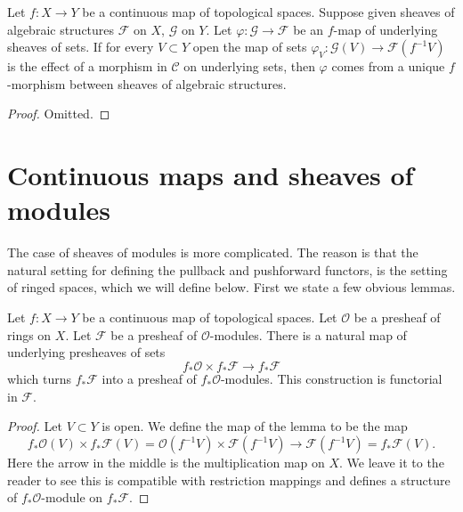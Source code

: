 \begin{lemma}
\label{lemma-f-map-sets-algebraic-structures}
Let $f : X \to Y$ be a continuous map of topological spaces.
Suppose given sheaves of algebraic structures
$\mathcal{F}$ on $X$, $\mathcal{G}$ on $Y$. Let
$\varphi : \mathcal{G} \to \mathcal{F}$ be an $f$-map
of underlying sheaves of sets. If for every $V \subset Y$ open the
map of sets $\varphi_V : \mathcal{G}(V) \to \mathcal{F}(f^{-1}V)$
is the effect of a morphism in $\mathcal{C}$ on underlying sets,
then $\varphi$ comes from a unique $f$-morphism between
sheaves of algebraic structures.
\end{lemma}

\begin{proof}
Omitted.
\end{proof}




\section{Continuous maps and sheaves of modules}
\label{section-presheaves-modules-functorial}

\noindent
The case of sheaves of modules is more complicated.
The reason is that the natural setting for defining
the pullback and pushforward functors, is the setting
of ringed spaces, which we will define below. First
we state a few obvious lemmas.

\begin{lemma}
\label{lemma-pushforward-presheaf-module}
Let $f : X \to Y$ be a continuous map of topological spaces.
Let $\mathcal{O}$ be a presheaf of rings on $X$. Let
$\mathcal{F}$ be a presheaf of $\mathcal{O}$-modules.
There is a natural map of underlying presheaves of sets
$$
f_*\mathcal{O} \times f_*\mathcal{F}
\longrightarrow
f_*\mathcal{F}
$$
which turns $f_*\mathcal{F}$ into a presheaf of
$f_*\mathcal{O}$-modules. This construction is
functorial in $\mathcal{F}$.
\end{lemma}

\begin{proof}
Let $V \subset Y$ is open. We define the map of the lemma
to be the map
$$
f_*\mathcal{O}(V) \times f_*\mathcal{F}(V)
=
\mathcal{O}(f^{-1}V) \times \mathcal{F}(f^{-1}V)
\to
\mathcal{F}(f^{-1}V)
=
f_*\mathcal{F}(V).
$$
Here the arrow in the middle is the multiplication map on $X$.
We leave it to the reader to see this is compatible with
restriction mappings and defines a structure of
$f_*\mathcal{O}$-module on $f_*\mathcal{F}$.
\end{proof}

